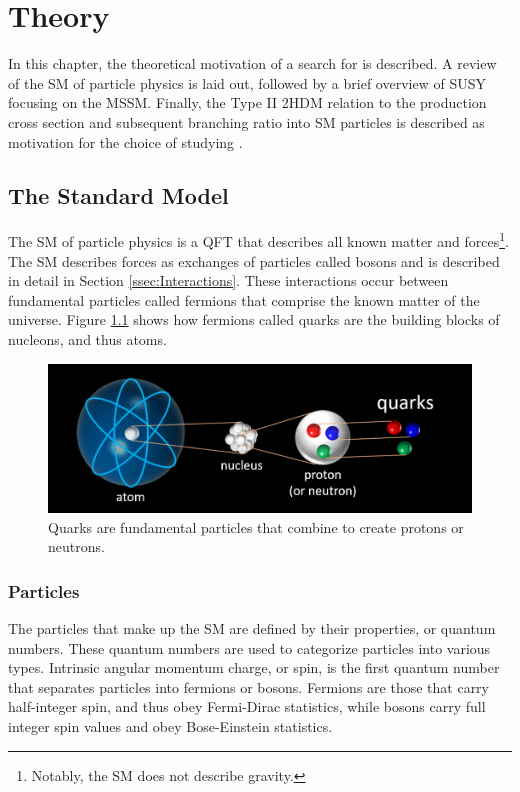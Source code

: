 \chapter{Theory}\label{chap:Theory}
    In this chapter, the theoretical motivation of a search for \HpmLong is described. A review of the \acrfull{SM} of particle physics is laid out, followed by a brief overview of \gls{SUSY} focusing on the \acrfull{MSSM}. Finally, the Type II \acrfull{2HDM} relation to the \Hpm production cross section and subsequent branching ratio into \gls{SM} particles is described as motivation for the choice of studying \HpmLong.

\section{The Standard Model}\label{sec:SM}
	The \gls{SM} of particle physics is a \gls{QFT} that describes all known matter and forces\footnote{Notably, the SM does not describe gravity.}. The \gls{SM} describes forces as exchanges of particles called bosons and is described in detail in Section \ref{ssec:Interactions}. These interactions occur between fundamental particles called fermions that comprise the known matter of the universe. Figure \ref{fig:atom-to-quarks} shows how fermions called quarks are the building blocks of nucleons, and thus atoms.

	\begin{figure}[!ht]
		\centering
		\includegraphics[width=.75\textwidth,keepaspectratio=true]{chapters/chapter2_theory/images/Atom_to_Quark_Cartoon.png}
		\caption{Quarks are fundamental particles that combine to create protons or neutrons\protect\footnotemark \cite{atom-to-quark}.}
		\label{fig:atom-to-quarks}
	\end{figure}

	\subsection{Particles}\label{ssec:Particles}
		The particles that make up the \gls{SM} are defined by their properties, or quantum numbers. These quantum numbers are used to categorize particles into various types. Intrinsic angular momentum charge, or spin, is the first quantum number that separates particles into fermions or bosons. Fermions are those that carry half-integer spin, and thus obey Fermi-Dirac statistics, while bosons carry full integer spin values and obey Bose-Einstein statistics.
		
